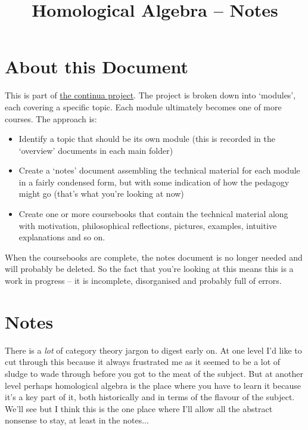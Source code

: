 \documentclass[oneside,english]{amsbook}
\numberwithin{section}{chapter}
\theoremstyle{plain}
\theoremstyle{definition}
\begin{document}
	
	\title{Homological Algebra -- Notes}
	
	\maketitle
	
	\tableofcontents
	
	\chapter*{About this Document}
	
	This is part of \href{https://github.com/FineArtMaths/continua}{the continua project}. The project is broken down into `modules', each covering a specific topic. Each module ultimately becomes one of more courses. The approach is:
	
	\begin{itemize}
		\item{Identify a topic that should be its own module (this is recorded in the `overview' documents in each main folder)}
		\item{Create a `notes' document assembling the technical material for each module in a fairly condensed form, but with some indication of how the pedagogy might go (that's what you're looking at now)}
		\item{Create one or more coursebooks that contain the technical material along with motivation, philosophical reflections, pictures, examples, intuitive explanations and so on.}
	\end{itemize}
	
	When the coursebooks are complete, the notes document is no longer needed and will probably be deleted. So the fact that you're looking at this means this is a work in progress -- it is incomplete, disorganised and probably full of errors.

	\chapter*{Notes}
		
		There is a \emph{lot} of category theory jargon to digest early on. At one level I'd like to cut through this because it always frustrated me as it seemed to be a lot of sludge to wade through before you got to the meat of the subject. But at another level perhaps homological algebra is the place where you have to learn it because it's a key part of it, both historically and in terms of the flavour of the subject. We'll see but I think this is the one place where I'll allow all the abstract nonsense to stay, at least in the notes...
	
\end{document}
